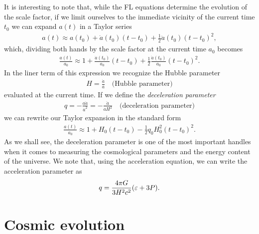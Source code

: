 It is interesting to note that, while the FL equations determine the evolution of
the scale factor, if we limit ourselves to the immediate vicinity of the current
time $t_0$ we can expand $a(t)$ in a Taylor series
\begin{align*}
  a(t) \approx a(t_0) + \dot{a}(t_0) (t - t_0) + \frac{1}{2}\ddot{a}(t_0) (t - t_0)^2,
\end{align*}
which, dividing both hands by the scale factor at the current time $a_0$ becomes
\begin{align*}
  \frac{a(t)}{a_0} \approx 1 + \frac{\dot{a}(t_0)}{a_0} (t - t_0) +
  \frac{1}{2}\frac{\ddot{a}(t_0)}{a_0} (t - t_0)^2.
\end{align*}
In the liner term of this expression we recognize the Hubble parameter
\begin{align*}
  H = \frac{\dot{a}}{a}\quad\text{(Hubble parameter)}
\end{align*}
evaluated at the current time. If we define the \emph{deceleration parameter}
\begin{align}\label{eq:deceleration_param}
  q = -\frac{a \ddot{a}}{\dot{a}^2} = -\frac{\ddot{a}}{a H^2} \quad\text{(deceleration parameter)}
\end{align}
we can rewrite our Taylor expansion in the standard form
\begin{align*}
  \frac{a(t)}{a_0} \approx 1 + H_0 (t - t_0) - \frac{1}{2} q_0 H_0^2 (t - t_0)^2.
\end{align*}
As we shall see, the deceleration parameter is one of the most important handles
when it comes to measuring the cosmological parameters and the energy content of
the universe. We note that, using the acceleration equation, we can write the acceleration
parameter as
\begin{align}\label{eq:deceleration_param_alt}
  q = \frac{4 \pi G}{3 H^2 c^2}(\varepsilon + 3P).
\end{align}



\section{Cosmic evolution}

